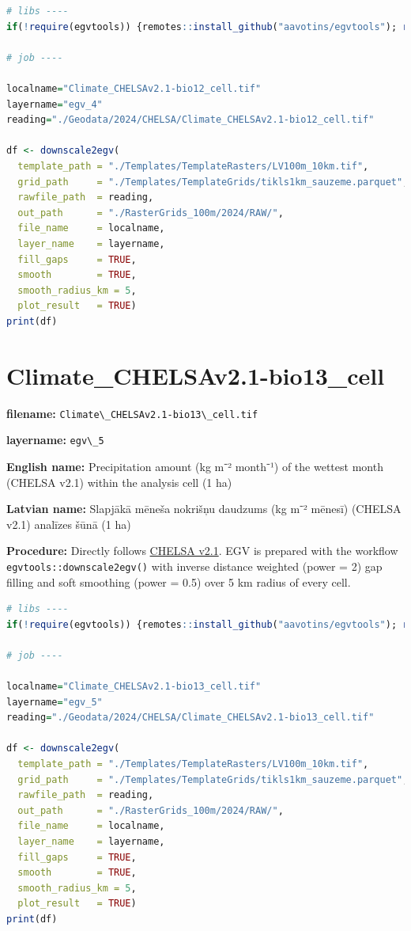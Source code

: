 \documentclass[
]{book}
\newcommand{\passthrough}[1]{#1}
\begin{document}
\begin{lstlisting}[language=R]
# libs ----
if(!require(egvtools)) {remotes::install_github("aavotins/egvtools"); require(egvtools)}

# job ----

localname="Climate_CHELSAv2.1-bio12_cell.tif"
layername="egv_4"
reading="./Geodata/2024/CHELSA/Climate_CHELSAv2.1-bio12_cell.tif"

df <- downscale2egv(
  template_path = "./Templates/TemplateRasters/LV100m_10km.tif",
  grid_path     = "./Templates/TemplateGrids/tikls1km_sauzeme.parquet",
  rawfile_path  = reading,
  out_path      = "./RasterGrids_100m/2024/RAW/",
  file_name     = localname,
  layer_name    = layername,
  fill_gaps     = TRUE,
  smooth        = TRUE,
  smooth_radius_km = 5,
  plot_result   = TRUE)
print(df)
\end{lstlisting}

\section{Climate\_CHELSAv2.1-bio13\_cell}\label{ch06.005}

\textbf{filename:} \passthrough{\lstinline!Climate\_CHELSAv2.1-bio13\_cell.tif!}

\textbf{layername:} \passthrough{\lstinline!egv\_5!}

\textbf{English name:} Precipitation amount (kg m⁻² month⁻¹) of the wettest month (CHELSA v2.1) within the analysis cell (1 ha)

\textbf{Latvian name:} Slapjākā mēneša nokrišņu daudzums (kg m⁻² mēnesī) (CHELSA v2.1) analīzes šūnā (1 ha)

\textbf{Procedure:} Directly follows \hyperref[Ch04.11]{CHELSA v2.1}. EGV is prepared with the
workflow \passthrough{\lstinline!egvtools::downscale2egv()!} with inverse distance weighted (power = 2)
gap filling and soft smoothing (power = 0.5) over 5 km radius of every cell.

\begin{lstlisting}[language=R]
# libs ----
if(!require(egvtools)) {remotes::install_github("aavotins/egvtools"); require(egvtools)}

# job ----

localname="Climate_CHELSAv2.1-bio13_cell.tif"
layername="egv_5"
reading="./Geodata/2024/CHELSA/Climate_CHELSAv2.1-bio13_cell.tif"

df <- downscale2egv(
  template_path = "./Templates/TemplateRasters/LV100m_10km.tif",
  grid_path     = "./Templates/TemplateGrids/tikls1km_sauzeme.parquet",
  rawfile_path  = reading,
  out_path      = "./RasterGrids_100m/2024/RAW/",
  file_name     = localname,
  layer_name    = layername,
  fill_gaps     = TRUE,
  smooth        = TRUE,
  smooth_radius_km = 5,
  plot_result   = TRUE)
print(df)
\end{lstlisting}
\end{document}

